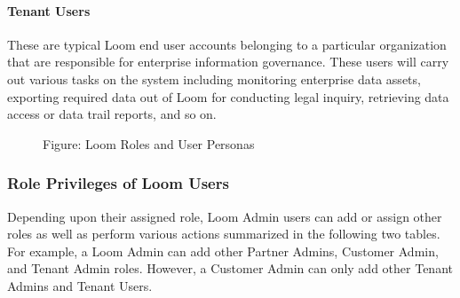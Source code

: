 \documentclass[letterpaper,10pt,english]{sphinxmanual}
\begin{document}
\paragraph{Tenant Users}
\label{\detokenize{loom_getting_started_guide:tenant-users}}
These are typical Loom end user accounts belonging to a particular organization that are responsible for enterprise information governance. These users will carry out various tasks on the system including monitoring enterprise data assets, exporting required data out of Loom for conducting legal inquiry, retrieving data access or data trail reports, and so on.

\begin{figure}[htbp]
\centering
\capstart

\noindent{}
\caption{Figure: Loom Roles and User Personas}\label{\detokenize{loom_getting_started_guide:id33}}\end{figure}


\subsubsection{Role Privileges of Loom Users}
\label{\detokenize{loom_getting_started_guide:role-privileges-of-loom-users}}
Depending upon their assigned role, Loom Admin users can add or assign other roles as well as perform various actions summarized in the following two tables. For example, a Loom Admin can add other Partner Admins, Customer Admin, and Tenant Admin roles. However, a Customer Admin can only add other Tenant Admins and Tenant Users.
\end{document}
